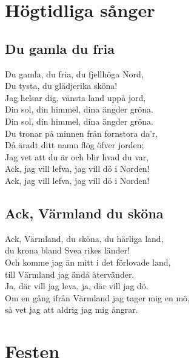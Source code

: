 \documentclass[twoside, openright]{report}
\begin{document}
\chapter{Högtidliga sånger}

\section{Du gamla du fria}
Du gamla, du fria, du fjellhöga Nord,\\
Du tysta, du glädjerika sköna!\\
Jag helsar dig, vänsta land uppå jord,\\
Din sol, din himmel, dina ängder gröna.\\
Din sol, din himmel, dina ängder gröna.\\

Du tronar på minnen från fornstora da'r,\\
Då äradt ditt namn flög öfver jorden;\\
Jag vet att du är och blir hvad du var,\\
Ack, jag vill lefva, jag vill dö i Norden!\\
Ack, jag vill lefva, jag vill dö i Norden!

\section{Ack, Värmland du sköna}
Ack, Värmland, du sköna, du härliga land,\\
du krona bland Svea rikes länder!\\
Och komme jag än mitt i det förlovade land,\\
till Värmland jag ändå återvänder.\\
Ja, där vill jag leva, ja, där vill jag dö.\\
Om en gång ifrån Värmland jag tager mig en mö,\\
så vet jag att aldrig jag mig ångrar.

\chapter{Festen}
\end{document}
